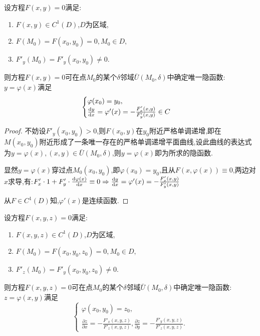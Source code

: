 \begin{theorem}
    设方程$F(x,y)=0$满足:
    \begin{enumerate}
        \item $F(x,y)\in C^1(D)$,$D$为区域,
        \item $F(M_0)=F(x_0,y_0)=0,M_0\in D,$
        \item $F'_y(M_0)=F'_y(x_0,y_0)\neq0.$
    \end{enumerate}
    则方程$F(x,y)=0$可在点$M_0$的某个$\delta$邻域$\bar{U}(M_0,\delta)$中确定唯一隐函数:$y=\varphi(x)$满足
    $$\begin{cases}
        \varphi(x_0)=y_0,\\
        \frac{\operatorname{d\!}{}y}{\operatorname{d\!}{}x}=\varphi'(x)=-\frac{F'_x(x,y)}{F'_y(x,y)}\in C
    \end{cases}$$
\end{theorem}
\begin{proof}
    不妨设$F'_y(x_0,y_0)>0$,则$F(x_0,y)$在$y_0$附近严格单调递增,即在$M(x_0,y_0)$附近形成了一条唯一存在的严格单调递增平面曲线,设此曲线的表达式为$y=\varphi(x),(x,y)\in \bar{U}(M_0,\delta)$,则$y=\varphi(x)$即为所求的隐函数.
    
    显然$y=\varphi(x)$穿过点$M_0(x_0,y_0)$,即$\varphi(x_0)=y_0$,且从$F(x,\varphi(x))\equiv 0$,两边对$x$求导,有:$F'_x\cdot 1+F'_y\cdot\frac{\operatorname{d\!}{}\varphi(x)}{\operatorname{d\!}{}x}\equiv 0\Rightarrow \frac{\operatorname{d\!}{}y}{\operatorname{d\!}{}x}=\varphi'(x)=-\frac{F'_x(x,y)}{F'_y(x,y)}$

    从$F\in C^1(D)$知,$\varphi'(x)$是连续函数.
\end{proof}

\begin{theorem}
    设方程$F(x,y,z)=0$满足:
    \begin{enumerate}
        \item $F(x,y,z)\in C^1(D)$,$D$为区域,
        \item $F(M_0)=F(x_0,y_0,z_0)=0,M_0\in D,$
        \item $F'_z(M_0)=F'_y(x_0,y_0,z_0)\neq0.$
    \end{enumerate}
    则方程$F(x,y,z)=0$可在点$M_0$的某个$\delta$邻域$\bar{U}(M_0,\delta)$中确定唯一隐函数:$z=\varphi(x,y)$满足
    $$\begin{cases}
        \varphi(x_0,y_0)=z_0,\\
        \frac{\partial z}{\partial x}=-\frac{F'_x(x,y,z)}{F'_z(x,y,z)},\frac{\partial z}{\partial y}=-\frac{F'_y(x,y,z)}{F'_z(x,y,z)}.
    \end{cases}$$
\end{theorem}

